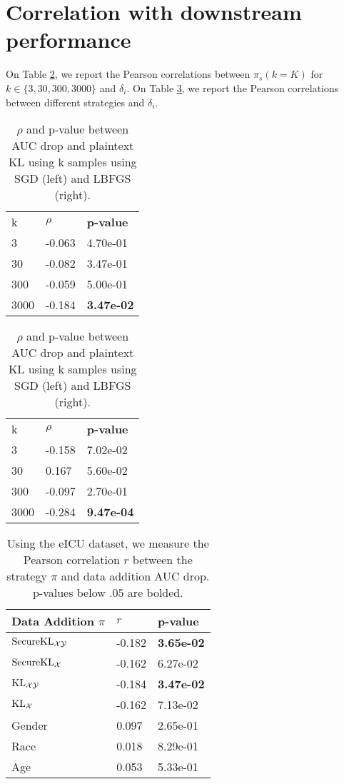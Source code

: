 \clearpage
\section{Correlation with downstream performance}\label{app:k_corr}
On Table \ref{tab:k_corr}, we report the Pearson correlations between $\pi_s(k=K)$ for $k \in \{3,30,300, 3000\}$ and $\delta_i$. 
On Table \ref{tab:encrypted_scores}, we report the Pearson correlations between different strategies and $\delta_i$. 
\begin{table}[]

\begin{tabular}{lll}
\toprule
k   & \textbf{$\rho$} & \textbf{p-value}             \\
3 &  -0.063 & 4.70e-01      \\                 
30 &  -0.082 & 3.47e-01 \\
300  & -0.059  & 5.00e-01 \\
3000 & -0.184 & \textbf{3.47e-02}\\
\bottomrule
\end{tabular}
\quad
\begin{tabular}{lll}
\toprule
k   & \textbf{$\rho$} & \textbf{p-value}             \\
3 &  -0.158 & 7.02e-02 \\                 
30 &  0.167 & 5.60e-02 \\
300  & -0.097 & 2.70e-01 \\
3000 & -0.284 & \textbf{9.47e-04}\\
\bottomrule
\end{tabular}
\caption{$\rho$ and p-value between AUC drop and plaintext KL using k samples using SGD (left) and LBFGS (right).}
\label{tab:k_corr}
\end{table}

\begin{table}[]
\begin{tabular}{lll}
\toprule
Data Addition $\pi$     & \textbf{$r$} & \textbf{p-value}             \\ \midrule
$\mathrm{Secure}\mathrm{KL}_{\mathcal{X}\mathcal{Y}}$ & -0.182 & \textbf{3.65e-02}                       \\
$\mathrm{Secure}\mathrm{KL}_\mathcal{X}$  & -0.162 & 6.27e-02  \\
$\mathrm{KL}_{\mathcal{X}\mathcal{Y}}$          & -0.184   &  \textbf{3.47e-02} \\
$\mathrm{KL}_\mathcal{X}$            & -0.162                           & 7.13e-02                       \\
Gender             & 0.097                            & 2.65e-01                       \\
Race               & 0.018                            & 8.29e-01                       \\
Age                & 0.053                            & 5.33e-01                    \\
\bottomrule
\end{tabular}
\caption{ Using the eICU dataset, we measure the Pearson correlation $r$ between the strategy $\pi$ and data addition AUC drop. p-values below $.05$ are bolded.} 
\label{tab:encrypted_scores}
\end{table}

